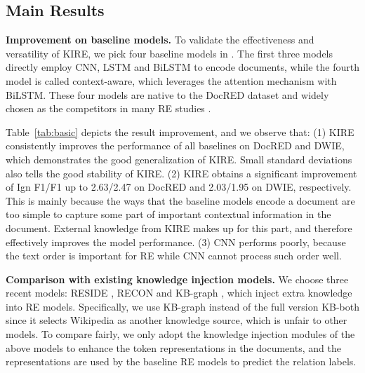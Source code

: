 \documentclass[runningheads]{llncs}
\begin{document}
\subsection{Main Results}
\label{subsect:main}

\textbf{Improvement on baseline models.}
To validate the effectiveness and versatility of KIRE, we pick four baseline models in \cite{yao2019docred}.
The first three models directly employ CNN, LSTM and BiLSTM to encode documents, while the fourth model is called context-aware, which leverages the attention mechanism with BiLSTM. 
These four models are native to the DocRED dataset and widely chosen as the competitors in many RE studies \cite{huang2021three,nan2020reasoning,tang2020hin,wang2020global,wang2019fine,xu2021entity,zeng2020double,zhou2021document}.

Table~\ref{tab:basic} depicts the result improvement, and we observe that: 
(1) KIRE consistently improves the performance of all baselines on DocRED and DWIE, which demonstrates the good generalization of KIRE. 
Small standard deviations also tells the good stability of KIRE.
(2) KIRE obtains a significant improvement of Ign F1/F1 up to 2.63/2.47 on DocRED and 2.03/1.95 on DWIE, respectively. 
This is mainly because the ways that the baseline models encode a document are too simple to capture some part of important contextual information in the document. 
External knowledge from KIRE makes up for this part, and therefore effectively improves the model performance.
(3) CNN performs poorly, because the text order is important for RE while CNN cannot process such order well. 

\textbf{Comparison with existing knowledge injection models.}
We choose three recent models: RESIDE \cite{vashishth2018reside}, RECON \cite{bastos2021recon} and KB-graph \cite{verlinden2021injecting}, which inject extra knowledge into RE models.
Specifically, we use KB-graph instead of the full version KB-both since it selects Wikipedia as another knowledge source, which is unfair to other models.
To compare fairly, we only adopt the knowledge injection modules of the above models to enhance the token representations in the documents, and the representations are used by the baseline RE models to predict the relation labels.
\end{document}
